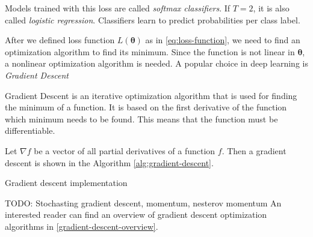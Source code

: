 Models trained with this loss are called \textit{softmax classifiers}. If $T = 2$, it is also called \textit{logistic regression}. Classifiers learn to predict probabilities per class label.

After we defined loss function $L(\pmb \theta)$  as in \ref{eq:loss-function}, we need to find an optimization algorithm to find its minimum. Since the function is not linear in $\pmb \theta$, a nonlinear optimization algorithm is needed. A popular choice in deep learning is \textit{Gradient Descent}

Gradient Descent is an iterative optimization algorithm that is used for finding the minimum of a function. It is based on the first derivative of the function which minimum needs to be found. This means that the function must be differentiable. 

Let $\nabla f$ be a vector of all partial derivatives of a function $f$. Then a gradient descent is shown in the Algorithm \ref{alg:gradient-descent}.

\begin{algorithm}[htb]
\caption{Gradient descent implementation}
\label{alg:gradient-descent}


\end{algorithm}


TODO: Stochasting gradient descent, momentum, nesterov momentum
 An interested reader can find an overview of gradient descent optimization algorithms in \ref{gradient-descent-overview}. 



